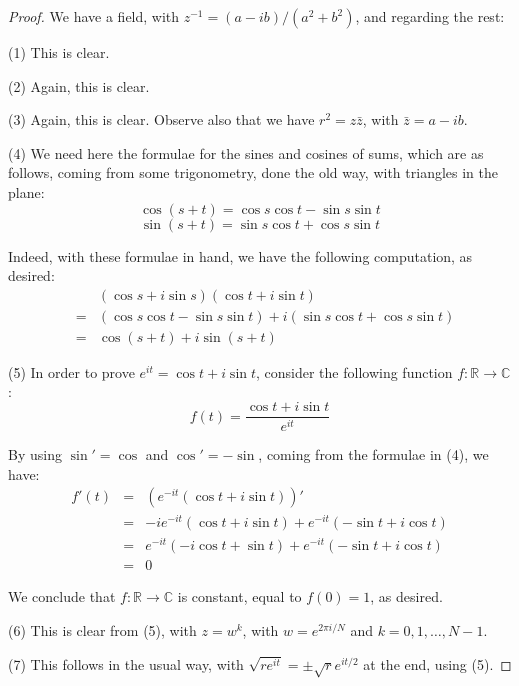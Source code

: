 \documentclass[12pt]{amsbook}
\begin{document}
\begin{proof}
We have a field, with $z^{-1}=(a-ib)/(a^2+b^2)$, and regarding the rest:

\medskip

(1) This is clear.

\medskip

(2) Again, this is clear.

\medskip

(3) Again, this is clear. Observe also that we have $r^2=z\bar{z}$, with $\bar{z}=a-ib$.

\medskip

(4) We need here the formulae for the sines and cosines of sums, which are as follows, coming from some trigonometry, done the old way, with triangles in the plane:
$$\cos(s+t)=\cos s\cos t-\sin s\sin t$$
$$\sin(s+t)=\sin s\cos t+\cos s\sin t$$

Indeed, with these formulae in hand, we have the following computation, as desired:
\begin{eqnarray*}
&&(\cos s+i\sin s)(\cos t+i\sin t)\\
&=&(\cos s\cos t-\sin s\sin t)+i(\sin s\cos t+\cos s\sin t)\\
&=&\cos(s+t)+i\sin(s+t)
\end{eqnarray*}

(5) In order to prove $e^{it}=\cos t+i\sin t$, consider the following function $f:\mathbb R\to\mathbb C$:
$$f(t)=\frac{\cos t+i\sin t}{e^{it}}$$

By using $\sin'=\cos$ and $\cos'=-\sin$, coming from the formulae in (4), we have:
\begin{eqnarray*}
f'(t)
&=&(e^{-it}(\cos t+i\sin t))'\\
&=&-ie^{-it}(\cos t+i\sin t)+e^{-it}(-\sin t+i\cos t)\\
&=&e^{-it}(-i\cos t+\sin t)+e^{-it}(-\sin t+i\cos t)\\
&=&0
\end{eqnarray*}

We conclude that $f:\mathbb R\to\mathbb C$ is constant, equal to $f(0)=1$, as desired.

\medskip

(6) This is clear from (5), with $z=w^k$, with $w=e^{2\pi i/N}$ and $k=0,1,\ldots,N-1$.

\medskip

(7) This follows in the usual way, with $\sqrt{re^{it}}=\pm\sqrt{r}e^{it/2}$ at the end, using (5). 
\end{proof}
\end{document}
